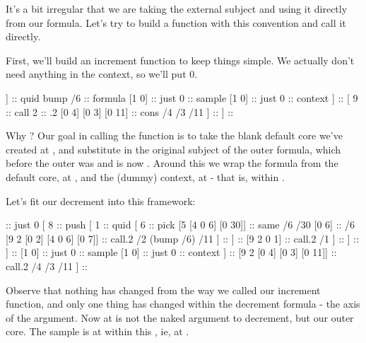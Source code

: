 It's a bit irregular that we are taking the external subject
and using it directly from our formula.  Let's try to build a
function with this convention and call it directly.

First, we'll build an increment function to keep things simple.
We actually don't need anything in the context, so we'll put 0.

\begin{code}
[ 8                                          ::  push
  [                                          ::  cons
    [1 [4 0 6]]                              ::  quid bump /6  ::  formula
    [1 0]                                    ::  just 0        ::  sample
    [1 0]                                    ::  just 0        ::  context
  ]                                          ::  
  [ 9                                        ::  call
    2                                        ::  .2
    [0 4] [0 3] [0 11]                       ::  cons /4 /3 /11
  ]                                          ::  
]                                            ::
\end{code}
Why \kode{[[0 4] [0 3] [0 11]]}?  Our goal in calling the function is
to take the blank default core we've created at , and
substitute in the original subject of the outer formula, which
before the outer  was  and is now .  Around this
we wrap the formula from the default core, at , and the
(dummy) context, at  - that is,  within .

Let's fit our decrement into this framework:

\begin{code}
[ 8                                          ::  push
  [                                          ::  cons
    [ 1                                      ::  quid    ::  formula
      [ 8                                    ::  push
        [1 0]                                ::  just 0
        [ 8                                  ::  push
          [ 1                                ::  quid
            [ 6                              ::  pick
              [5 [4 0 6] [0 30]]             ::  same /6 /30
              [0 6]                          ::  /6
              [9 2 [0 2] [4 0 6] [0 7]]      ::  call.2 /2 (bump /6) /11
            ]                                ::
          ]                                  ::
          [9 2 0 1]                          ::  call.2 /1
        ]                                    ::
      ]                                      ::
    ]                                        ::
    [1 0]                                    ::  just 0  ::  sample
    [1 0]                                    ::  just 0  ::  context
  ]                                          ::
  [9 2 [0 4] [0 3] [0 11]]                   ::  call.2 /4 /3 /11
]                                            ::
\end{code}
Observe that nothing has changed from the way we called our
increment function, and only one thing has changed within the
decrement formula - the axis of the argument.  Now at  is not
the naked argument to decrement, but our outer core.  The sample
is at  within this , ie, at .

